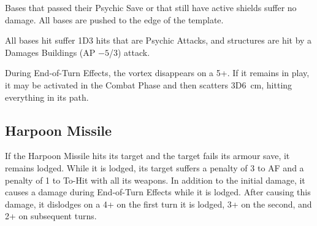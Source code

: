 Bases that passed their Psychic Save or that still have active shields suffer no damage. All bases are pushed to the edge of the template.

All bases hit suffer 1D3 hits that are Psychic Attacks, and structures are hit by a Damages Buildings (AP $-5$/3) attack.

During End-of-Turn Effects, the vortex disappears on a 5+. If it remains in play, it may be activated in the Combat Phase and then scatters 3D6~cm, hitting everything in its path.

\subsection{Harpoon Missile}

If the Harpoon Missile hits its target and the target fails its armour save, it remains lodged. While it is lodged, its target suffers a penalty of 3 to AF and a penalty of 1 to To-Hit with all its weapons. In addition to the initial damage, it causes a damage during End-of-Turn Effects while it is lodged. After causing this damage, it dislodges on a 4+ on the first turn it is lodged, 3+ on the second, and 2+ on subsequent turns.
